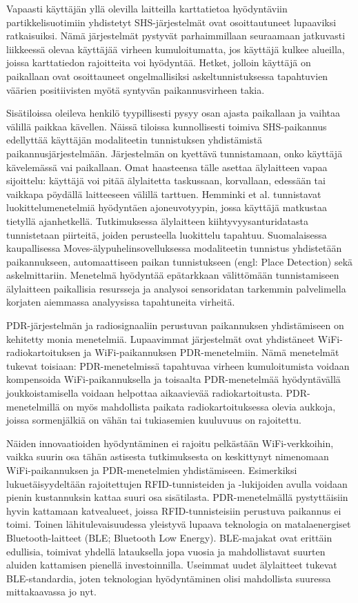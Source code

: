 Vapaasti käyttäjän yllä olevilla laitteilla
karttatietoa hyödyntäviin partikkelisuotimiin yhdistetyt SHS-järjestelmät ovat
osoittautuneet lupaaviksi ratkaisuiksi.
Nämä järjestelmät pystyvät parhaimmillaan seuraamaan jatkuvasti liikkeessä
olevaa käyttäjää virheen kumuloitumatta, jos käyttäjä kulkee alueilla, joissa
karttatiedon rajoitteita voi hyödyntää. Hetket, jolloin käyttäjä on paikallaan
ovat osoittauneet ongelmallisiksi askeltunnistuksessa tapahtuvien
väärien positiivisten myötä syntyvän
paikannusvirheen takia.

Sisätiloissa oleileva henkilö tyypillisesti pysyy osan ajasta paikallaan
ja vaihtaa välillä paikkaa kävellen. Näissä tiloissa kunnollisesti toimiva
SHS-paikannus edellyttää käyttäjän modaliteetin
tunnistuksen yhdistämistä paikannusjärjestelmään.
Järjestelmän on kyettävä tunnistamaan, onko käyttäjä kävelemässä vai paikallaan.
Omat haasteensa tälle asettaa älylaitteen vapaa sijoittelu: käyttäjä voi
pitää älylaitetta taskussaan, korvallaan, edessään tai vaikkapa pöydällä
laitteeseen välillä tarttuen. Hemminki et al. \cite{hemminki2013} tunnistavat
luokittelumenetelmiä hyödyntäen ajoneuvotyypin, jossa käyttäjä matkustaa
tietyllä ajanhetkellä. Tutkimuksessa älylaitteen kiihtyvyysanturidatasta
tunnistetaan piirteitä, joiden perusteella luokittelu tapahtuu. Suomalaisessa
kaupallisessa Moves-älypuhelinsovelluksessa modaliteetin tunnistus yhdistetään
paikannukseen, automaattiseen paikan tunnistukseen (engl: Place Detection)
sekä askelmittariin. Menetelmä hyödyntää epätarkkaan välittömään tunnistamiseen
älylaitteen paikallisia resursseja ja analysoi sensoridatan tarkemmin
palvelimella korjaten aiemmassa analyysissa tapahtuneita virheitä.

PDR-järjestelmän ja radiosignaaliin perustuvan paikannuksen yhdistämiseen on
kehitetty monia menetelmiä. Lupaavimmat järjestelmät ovat yhdistäneet
WiFi-radiokartoituksen ja WiFi-paikannuksen PDR-menetelmiin.
Nämä menetelmät tukevat toisiaan: PDR-menetelmissä tapahtuvaa virheen
kumuloitumista voidaan kompensoida WiFi-paikannuksella ja toisaalta
PDR-menetelmää hyödyntävällä joukkoistamisella voidaan helpottaa
aikaavievää radiokartoitusta. PDR-menetelmillä on myös mahdollista paikata
radiokartoituksessa olevia aukkoja, joissa sormenjälkiä on vähän tai 
tukiasemien kuuluvuus on rajoitettu.

Näiden innovaatioiden hyödyntäminen ei rajoitu pelkästään WiFi-verkkoihin,
vaikka suurin osa tähän astisesta tutkimuksesta on keskittynyt
nimenomaan WiFi-paikannuksen ja PDR-menetelmien yhdistämiseen. Esimerkiksi
lukuetäisyydeltään rajoitettujen RFID-tunnisteiden ja -lukijoiden avulla
voidaan pienin kustannuksin kattaa suuri osa sisätilasta. PDR-menetelmällä
pystyttäisiin hyvin kattamaan katvealueet, joissa RFID-tunnisteisiin
perustuva paikannus ei toimi. Toinen lähitulevaisuudessa yleistyvä lupaava
teknologia on matalaenergiset Bluetooth-laitteet (BLE; Bluetooth Low Energy).
BLE-majakat ovat erittäin edullisia, toimivat yhdellä latauksella jopa
vuosia ja mahdollistavat suurten aluiden kattamisen pienellä investoinnilla.
Useimmat uudet älylaitteet tukevat BLE-standardia, joten teknologian
hyödyntäminen olisi mahdollista suuressa mittakaavassa jo nyt.

